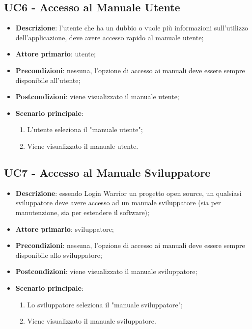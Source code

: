 \subsection{UC6 - Accesso al Manuale Utente}

\begin{itemize}
  \item \textbf{Descrizione}: l'utente che ha un dubbio o vuole più informazioni sull'utilizzo dell'applicazione, deve avere accesso rapido al manuale utente;
  \item \textbf{Attore primario}: utente;
  \item \textbf{Precondizioni}: nessuna, l'opzione di accesso ai manuali deve essere sempre disponibile all'utente;
  \item \textbf{Postcondizioni}: viene visualizzato il manuale utente;
  \item \textbf{Scenario principale}:
  \begin{enumerate}
    \item L'utente seleziona il "manuale utente";
    \item Viene visualizzato il manuale utente.
  \end{enumerate}
\end{itemize}

\subsection{UC7 - Accesso al Manuale Sviluppatore}

\begin{itemize}
  \item \textbf{Descrizione}: essendo Login Warrior un progetto open source, un qualsiasi sviluppatore deve avere accesso ad un manuale sviluppatore (sia per manutenzione, sia per estendere il software);
  \item \textbf{Attore primario}: sviluppatore;
  \item \textbf{Precondizioni}: nessuna, l'opzione di accesso ai manuali deve essere sempre disponibile allo sviluppatore;
  \item \textbf{Postcondizioni}: viene visualizzato il manuale sviluppatore;
  \item \textbf{Scenario principale}:
  \begin{enumerate}
    \item Lo sviluppatore seleziona il "manuale sviluppatore";
    \item Viene visualizzato il manuale sviluppatore.
  \end{enumerate}
\end{itemize}

